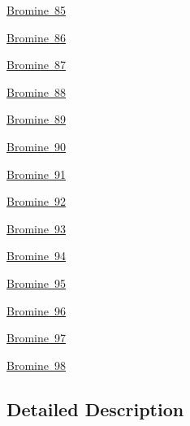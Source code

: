 \begin{DoxyCompactItemize}
\item 
\mbox{\hyperlink{group___isotope_const-_bromine-_br85}{Bromine 85}}
\item 
\mbox{\hyperlink{group___isotope_const-_bromine-_br86}{Bromine 86}}
\item 
\mbox{\hyperlink{group___isotope_const-_bromine-_br87}{Bromine 87}}
\item 
\mbox{\hyperlink{group___isotope_const-_bromine-_br88}{Bromine 88}}
\item 
\mbox{\hyperlink{group___isotope_const-_bromine-_br89}{Bromine 89}}
\item 
\mbox{\hyperlink{group___isotope_const-_bromine-_br90}{Bromine 90}}
\item 
\mbox{\hyperlink{group___isotope_const-_bromine-_br91}{Bromine 91}}
\item 
\mbox{\hyperlink{group___isotope_const-_bromine-_br92}{Bromine 92}}
\item 
\mbox{\hyperlink{group___isotope_const-_bromine-_br93}{Bromine 93}}
\item 
\mbox{\hyperlink{group___isotope_const-_bromine-_br94}{Bromine 94}}
\item 
\mbox{\hyperlink{group___isotope_const-_bromine-_br95}{Bromine 95}}
\item 
\mbox{\hyperlink{group___isotope_const-_bromine-_br96}{Bromine 96}}
\item 
\mbox{\hyperlink{group___isotope_const-_bromine-_br97}{Bromine 97}}
\item 
\mbox{\hyperlink{group___isotope_const-_bromine-_br98}{Bromine 98}}
\end{DoxyCompactItemize}


\subsection{Detailed Description}
